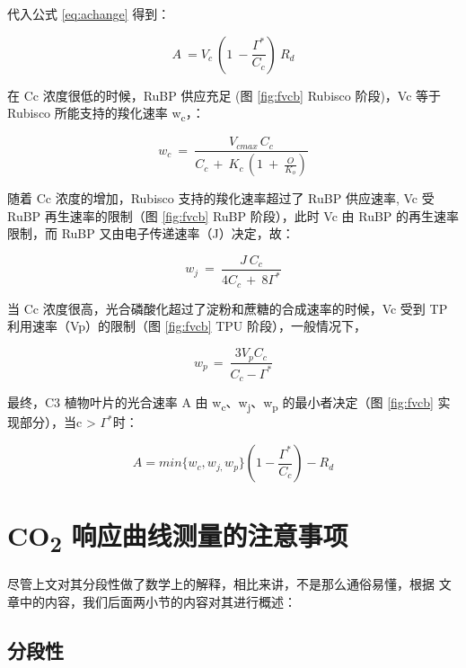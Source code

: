 \documentclass[
]{krantz}
\begin{document}
代入公式 \eqref{eq:achange} 得到：

\begin{equation}
A\ =V_{c}\ (1\ -\frac{\Gamma^{*}}{C_{c}})\ R_{d}
\label{eq:combine2}
\end{equation}

在 Cc 浓度很低的时候，RuBP 供应充足 (图 \ref{fig:fvcb} Rubisco 阶段)，Vc 等于 Rubisco
所能支持的羧化速率 w\textsubscript{c}，：

\begin{equation}
w_{c}\ =\ \frac{V_{cmax\ }C_{c}}{C_{c\ }+\ K_{c\ }(1\ +\ \frac{O}{K_{o}})}
\label{eq:wc}
\end{equation}

随着 Cc 浓度的增加，Rubisco 支持的羧化速率超过了 RuBP 供应速率, Vc 受 RuBP 再生速率的限制（图 \ref{fig:fvcb}
RuBP 阶段），此时 Vc 由 RuBP 的再生速率限制，而 RuBP 又由电子传递速率（J）决定，故：

\begin{equation}
w_{j}\ =\ \frac{J\ C_{c}}{4C_{c\ }+\ 8\Gamma^{*}}
\label{eq:wj}
\end{equation}

当 Cc 浓度很高，光合磷酸化超过了淀粉和蔗糖的合成速率的时候，Vc 受到 TP 利用速率（Vp）的限制（图 \ref{fig:fvcb}
TPU 阶段），一般情况下，

\begin{equation}
w_{p\ }=\ \frac{3V_{p}C_{c}}{C_{c}-\Gamma^{*}}
\label{eq:wp}
\end{equation}

最终，C3 植物叶片的光合速率 A 由 w\textsubscript{c}、w\textsubscript{j}、w\textsubscript{p}
的最小者决定（图 \ref{fig:fvcb} 实现部分），当c \textgreater{} \(\Gamma^{*}\)时：

\begin{equation}
A=min\{w_{c},w_{j,}w_{p}\}(1-\frac{\Gamma^{*}}{C_{c}})-R_{d}
\label{eq:fvcbfin}
\end{equation}

\hypertarget{co2_note}{%
\section{\texorpdfstring{CO\textsubscript{2} 响应曲线测量的注意事项}{CO2 响应曲线测量的注意事项}}\label{co2_note}}

尽管上文对其分段性做了数学上的解释，相比来讲，不是那么通俗易懂，根据 \citet{matthew2018} 文章中的内容，我们后面两小节的内容对其进行概述：

\hypertarget{model_3}{%
\subsection{分段性}\label{model_3}}
\end{document}
